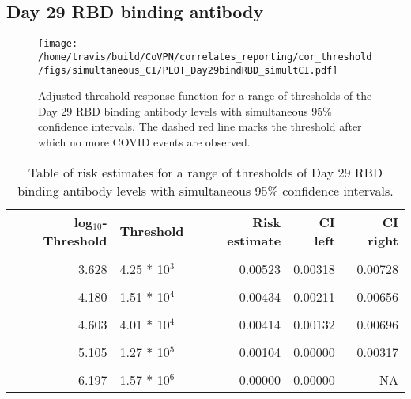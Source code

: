 \documentclass[]{book}
\theoremstyle{definition}
\theoremstyle{definition}
\theoremstyle{definition}
\newcommand{\1}{\mathbbm{1}}
\begin{document}
\newpage

\newpage

\newpage

\hypertarget{day-29-rbd-binding-antibody-2}{%
\subsection{Day 29 RBD binding antibody}\label{day-29-rbd-binding-antibody-2}}

\begin{figure}[H]
\centering
\texttt{[image: /home/travis/build/CoVPN/correlates\_reporting/cor\_threshold/figs/simultaneous\_CI/PLOT\_Day29bindRBD\_simultCI.pdf]}
\caption{Adjusted threshold-response function for a range of thresholds of the
  Day 29 RBD binding antibody levels with simultaneous 95\% confidence intervals. The dashed red line marks the threshold after which no more COVID events are observed. }
\end{figure}
\begin{table}[!h]

\caption{\label{tab:unnamed-chunk-389}Table of risk estimates for a range of thresholds of Day 29 RBD binding antibody levels with simultaneous 95\% confidence intervals.}
\centering
\begin{tabular}[t]{rlrrr}
\toprule
log$_{10}$-Threshold & Threshold & Risk estimate & CI left & CI right\\
\midrule
\cellcolor{gray!6}{2.882} & \cellcolor{gray!6}{7.62 * 10$^2$} & \cellcolor{gray!6}{0.00576} & \cellcolor{gray!6}{0.00374} & \cellcolor{gray!6}{0.00779}\\
3.628 & 4.25 * 10$^3$ & 0.00523 & 0.00318 & 0.00728\\
\cellcolor{gray!6}{3.889} & \cellcolor{gray!6}{7.74 * 10$^3$} & \cellcolor{gray!6}{0.00459} & \cellcolor{gray!6}{0.00255} & \cellcolor{gray!6}{0.00663}\\
4.180 & 1.51 * 10$^4$ & 0.00434 & 0.00211 & 0.00656\\
\cellcolor{gray!6}{4.395} & \cellcolor{gray!6}{2.48 * 10$^4$} & \cellcolor{gray!6}{0.00486} & \cellcolor{gray!6}{0.00217} & \cellcolor{gray!6}{0.00755}\\
4.603 & 4.01 * 10$^4$ & 0.00414 & 0.00132 & 0.00696\\
\cellcolor{gray!6}{4.826} & \cellcolor{gray!6}{6.70 * 10$^4$} & \cellcolor{gray!6}{0.00365} & \cellcolor{gray!6}{0.00054} & \cellcolor{gray!6}{0.00676}\\
5.105 & 1.27 * 10$^5$ & 0.00104 & 0.00000 & 0.00317\\
\cellcolor{gray!6}{5.422} & \cellcolor{gray!6}{2.64 * 10$^5$} & \cellcolor{gray!6}{0.00097} & \cellcolor{gray!6}{0.00000} & \cellcolor{gray!6}{0.00385}\\
6.197 & 1.57 * 10$^6$ & 0.00000 & 0.00000 & NA\\
\bottomrule
\end{tabular}
\end{table}
\end{document}

